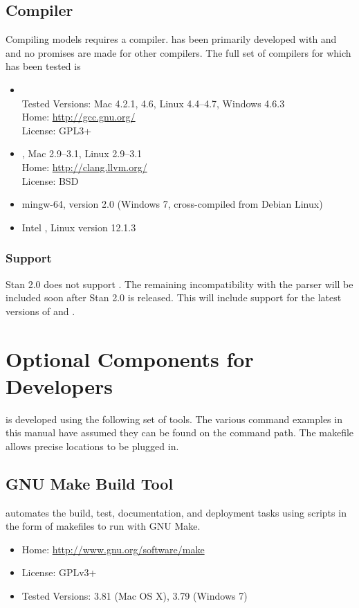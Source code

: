 \subsection{\Cpp Compiler}

Compiling \Stan models requires a \Cpp compiler.  \Stan has been
primarily developed with \clang and \gpp and no promises are made for
other compilers.  The full set of compilers for which \Stan has been
tested is
%
\begin{itemize}
%
\item \gpp
\\
Tested Versions: Mac 4.2.1, 4.6, Linux 4.4--4.7, Windows 4.6.3
\\
Home: \url{http://gcc.gnu.org/}
\\
License: GPL3+
%
\item \clang, Mac 2.9--3.1, Linux 2.9--3.1
\\
Home: \url{http://clang.llvm.org/}
\\
License: BSD
%
\item mingw-64, version 2.0 (Windows 7, cross-compiled from Debian Linux)
%
\item Intel \Cpp, Linux version 12.1.3
%
\end{itemize}
%

\subsubsection{ Support} 

Stan 2.0 does not support .  The remaining incompatibility with
the parser will be included soon after Stan 2.0 is released.  This
will include support for the latest versions of  and
.


\section{Optional Components for Developers}

\Stan is developed using the following set of tools.  The various
command examples in this manual have assumed they can be found on
the command path.  The makefile allows precise locations to be plugged
in. 

\subsection{GNU Make Build Tool}

\Stan automates the build, test, documentation, and deployment tasks
using scripts in the form of makefiles to run with GNU Make.
%
\begin{itemize}
\item Home: \url{http://www.gnu.org/software/make}
\item License: GPLv3+
\item Tested Versions: 3.81 (Mac OS X), 3.79 (Windows 7)
\end{itemize}
%


